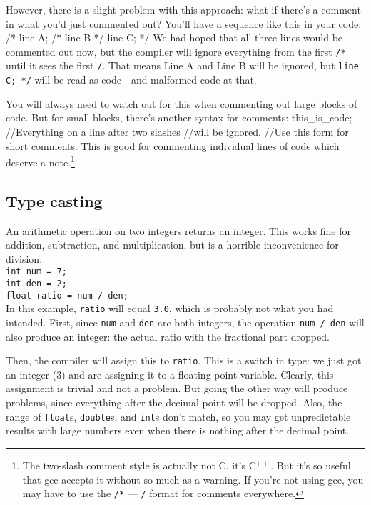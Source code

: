 \documentclass[12pt]{article}
\begin{document}
However, there is a slight problem with this approach: what if there's a comment in what you'd just
commented out? You'll have a sequence like this in your code: 
/* line A; 
   /* line B */ 
   line C; 
*/
We had hoped that all three lines would be commented out now, but the compiler will ignore everything
from the first {\tt /*} until it sees the first {\tt */}. That means Line A and Line B will be ignored,
but {\tt line C; */} will be read as code---and malformed code at that.

You will always need to watch out for this when commenting out large blocks of code. But for small
blocks, there's another syntax for comments:
this_is_code;    //Everything on a line after two slashes 
                 //will be ignored.
                 //Use this form for short comments.
This is good for commenting individual lines of code which deserve a note.\footnote{The two-slash
comment style is actually not C, it's C$^{++}$. But it's so useful that gcc accepts it without so much as
a warning. If you're not using gcc, you may have to use the {\tt /*} --- {\tt */} format for comments
everywhere.}

\subsection{Type casting}\label{casting}   An arithmetic operation on two integers returns an integer. This works fine for
addition, subtraction, and multiplication, but is a horrible inconvenience for division.\\
{\tt int num = 7;\\
int den = 2;\\
float ratio = num / den;\\
}
In this example, {\tt ratio} will equal {\tt 3.0}, which is probably not what you had intended. 
First, since {\tt num} and {\tt den} are both integers, the operation
{\tt num / den} will also produce an integer: the actual ratio with the
fractional part dropped.

Then, the compiler will assign this to {\tt ratio}. This is a switch in type: we just got an integer (3)
and are assigning it to a floating-point variable. Clearly, this assignment is trivial and not a problem.
But going the other way will produce problems, since everything after the decimal point will be
dropped.
Also, the range of {\tt float}s, {\tt double}s, and {\tt int}s don't match, so you may get unpredictable
results with large numbers even when there is nothing after the decimal point.
\end{document}
